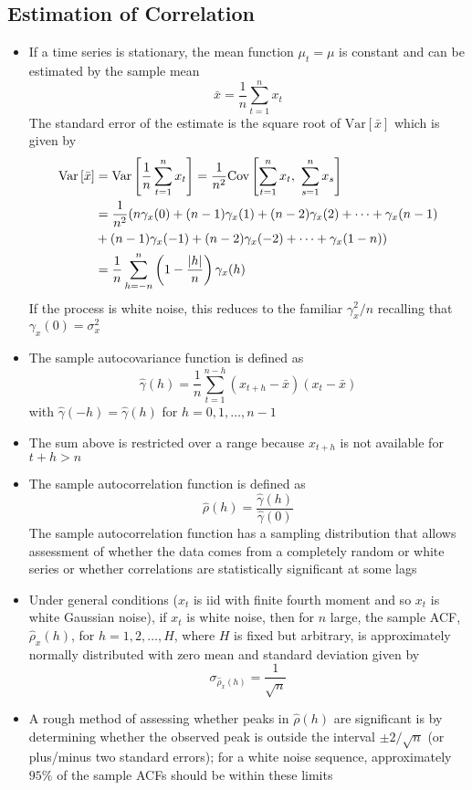 \documentclass[12pt]{article}
\renewcommand{\var}[1]{\text{Var}\left[ #1 \right]}
\newcommand{\cov}[2]{\text{Cov}\left[#1, ~#2\right]}
\begin{document}
\subsection{Estimation of Correlation}
\begin{itemize}
\item If a time series is stationary, the mean function $\mu_t = \mu$ is constant and can be estimated by the sample mean $$ \bar{x} = \frac{1}{n} \sum_{t=1}^n x_t $$ The standard error of the estimate is the square root of $\var{\bar{x}}$ which is given by 
$$ \begin{aligned} \var{\bar{x}} &= \var{\frac{1}{n} \sum_{t=1}^n x_t} = \frac{1}{n^2}\cov{\sum_{t=1}^n x_t}{\sum_{s=1}^n x_s} \\ &= \frac{1}{n^2}(n\gamma_x(0) + (n-1)\gamma_x(1) + (n-2)\gamma_x(2) + \dots + \gamma_x(n-1) \\ &+ (n-1)\gamma_x(-1) + (n-2)\gamma_x(-2) + \dots + \gamma_x(1-n)) \\ &= \frac{1}{n}\sum_{h = -n}^n \left( 1 - \frac{\abs{h}}{n}\right)\gamma_x(h) \end{aligned} $$ 
If the process is white noise, this reduces to the familiar $\gamma^2_x / n$ recalling that $\gamma_x(0) = \sigma^2_x$
\item The sample autocovariance function is defined as $$ \hat{\gamma}(h) = \frac{1}{n} \sum_{t=1}^{n-h} (x_{t+h} - \bar{x})(x_t - \bar{x}) $$ with $\hat{\gamma}(-h) = \hat{\gamma}(h)$ for $h = 0,1,\dots,n-1$
\item The sum above is restricted over a range because $x_{t+h}$ is not available for $t+h > n$ 
\item The sample autocorrelation function is defined as $$ \hat{\rho}(h) = \frac{\hat{\gamma}(h)}{\hat{\gamma}(0)} $$ The sample autocorrelation function has a sampling distribution that allows assessment of whether the data comes from a completely random or white series or whether correlations are statistically significant at some lags 
\item Under general conditions ($x_t$ is iid with finite fourth moment and so $x_t$ is white Gaussian noise), if $x_t$ is white noise, then for $n$ large, the sample ACF, $\hat{\rho}_x(h)$, for $h = 1,2,\dots,H$, where $H$ is fixed but arbitrary, is approximately normally distributed with zero mean and standard deviation given by $$ \sigma_{\hat{\rho}_x(h)} = \frac{1}{\sqrt{n}} $$ 
\item A rough method of assessing whether peaks in $\hat{\rho}(h)$ are significant is by determining whether the observed peak is outside the interval $\pm 2 / \sqrt{n}$ (or plus/minus two standard errors); for a white noise sequence, approximately $95\%$ of the sample ACFs should be within these limits 

\end{itemize}
\end{document}
